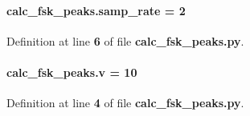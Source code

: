 \paragraph[{samp\+\_\+rate}]{ calc\+\_\+fsk\+\_\+peaks.\+samp\+\_\+rate = 2}\label{namespacecalc__fsk__peaks_a4ee479c8c3f78a83f0867e38ef1bc46f}


Definition at line {\bf 6} of file {\bf calc\+\_\+fsk\+\_\+peaks.\+py}.

\paragraph[{v}]{ calc\+\_\+fsk\+\_\+peaks.\+v = 10}\label{namespacecalc__fsk__peaks_ae5b26a0513970035dbf358b6b36b6159}


Definition at line {\bf 4} of file {\bf calc\+\_\+fsk\+\_\+peaks.\+py}.

